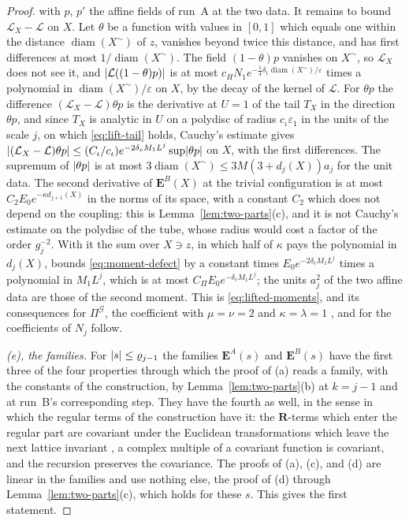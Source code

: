\documentclass[11pt]{preprint}
\DeclarePairedDelimiter{\abs}{\lvert}{\rvert}
\numberwithin{equation}{section}
\theoremstyle{definition}
\theoremstyle{remark}
\theoremstyle{plain}
\begin{document}
\begin{proof}
with $p$, $p'$ the affine fields of run~A at the two data. It remains to bound $\mathcal L_X - \mathcal L$ on $X$. Let $\theta$ be a function with values in $[0, 1]$ which equals one within the distance $\operatorname{diam}(X^\sim)$ of $z$, vanishes beyond twice this distance, and has first differences at most $1/\operatorname{diam}(X^\sim)$. The field $(1 - \theta)p$ vanishes on $X^\sim$, so $\mathcal L_X$ does not see it, and $\abs{\mathcal L((1 - \theta)p)}$ is at most $c_HN_1e^{-\frac14\delta_1\operatorname{diam}(X^\sim)/\varepsilon}$ times a polynomial in $\operatorname{diam}(X^\sim)/\varepsilon$ on $X$, by the decay of the kernel of $\mathcal L$. For $\theta p$ the difference $(\mathcal L_X - \mathcal L)\theta p$ is the derivative at $U = 1$ of the tail $T_X$ in the direction $\theta p$, and since $T_X$ is analytic in $U$ on a polydisc of radius $c_\iota\varepsilon_1$ in the units of the scale $j$, on which \eqref{eq:lift-tail} holds, Cauchy's estimate gives $\abs{(\mathcal L_X - \mathcal L)\theta p} \leq (C_\iota/c_\iota)e^{-2\delta_cM_1L^j}\sup\abs{\theta p}$ on $X$, with the first differences. The supremum of $\abs{\theta p}$ is at most $3\operatorname{diam}(X^\sim) \leq 3M(3 + d_j(X))a_j$ for the unit data. The second derivative of $\mathbf E^B(X)$ at the trivial configuration is at most $C_2E_0e^{-\kappa d_{j+1}(X)}$ in the norms of its space, with a constant $C_2$ which does not depend on the coupling: this is Lemma~\ref{lem:two-parts}(c), and it is not Cauchy's estimate on the polydisc of the tube, whose radius would cost a factor of the order $g_j^{-2}$. With it the sum over $X \ni z$, in which half of $\kappa$ pays the polynomial in $d_j(X)$, bounds \eqref{eq:moment-defect} by a constant times $E_0e^{-2\delta_cM_1L^j}$ times a polynomial in $M_1L^j$, which is at most $C_\Pi E_0e^{-\delta_cM_1L^j}$; the units $a_j^2$ of the two affine data are those of the second moment. This is \eqref{eq:lifted-moments}, and its consequences for $\Pi^{\mathcal G}$, the coefficient with $\mu = \nu = 2$ and $\kappa = \lambda = 1$ \cite[(3.61)]{BalabanCRE}, and for the coefficients of $N_j$ follow.

\emph{(e), the families.} For $\abs s \leq \varrho_{j-1}$ the families $\mathbf E^A(s)$ and $\mathbf E^B(s)$ have the first three of the four properties through which the proof of (a) reads a family, with the constants of the construction, by Lemma~\ref{lem:two-parts}(b) at $k = j - 1$ and at run~B's corresponding step. They have the fourth as well, in the sense in which the regular terms of the construction have it: the $\mathbf R$-terms which enter the regular part are covariant under the Euclidean transformations which leave the next lattice invariant \cite[p.~271, ll.~1--5]{BalabanCRE}, a complex multiple of a covariant function is covariant, and the recursion preserves the covariance. The proofs of (a), (c), and (d) are linear in the families and use nothing else, the proof of (d) through Lemma~\ref{lem:two-parts}(c), which holds for these $s$. This gives the first statement.


\end{proof}
\end{document}
